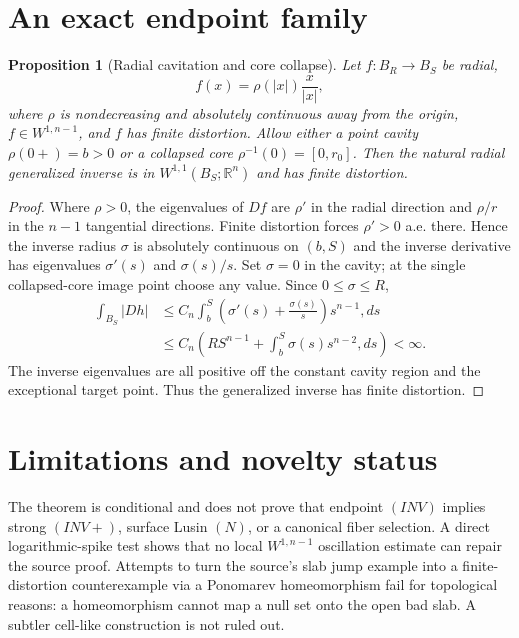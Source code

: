 \documentclass[11pt]{article}
\newtheorem{proposition}{Proposition}
\newcommand{\R}{\mathbb R}
\begin{document}
\section{An exact endpoint family}

\begin{proposition}[Radial cavitation and core collapse]
Let $f:B_R\to B_S$ be radial,
\[
 f(x)=\rho(|x|)\frac{x}{|x|},
\]
where $\rho$ is nondecreasing and absolutely continuous away from the origin,
$f\in W^{1,n-1}$, and $f$ has finite distortion.  Allow either a point
cavity $\rho(0+)=b>0$ or a collapsed core $\rho^{-1}(0)=[0,r_0]$.
Then the natural radial generalized inverse is in $W^{1,1}(B_S;\R^n)$ and
has finite distortion.
\end{proposition}

\begin{proof}
Where $\rho>0$, the eigenvalues of $Df$ are $\rho'$ in the radial direction
and $\rho/r$ in the $n-1$ tangential directions.  Finite distortion forces
$\rho'>0$ a.e. there.  Hence the inverse radius $\sigma$ is absolutely
continuous on $(b,S)$ and the inverse derivative has eigenvalues
$\sigma'(s)$ and $\sigma(s)/s$.  Set $\sigma=0$ in the cavity; at the single
collapsed-core image point choose any value.  Since $0\leq\sigma\leq R$,
\begin{align*}
 \int_{B_S}|Dh|
 &\leq C_n\int_b^S
 \left(\sigma'(s)+\frac{\sigma(s)}s\right)s^{n-1},ds\\
 &\leq C_n\left(RS^{n-1}+
 \int_b^S\sigma(s)s^{n-2},ds\right)<\infty.
\end{align*}
The inverse eigenvalues are all positive off the constant cavity region and
the exceptional target point.  Thus the generalized inverse has finite
distortion.
\end{proof}

\section{Limitations and novelty status}

The theorem is conditional and does not prove that endpoint $(INV)$ implies
strong $(INV+)$, surface Lusin $(N)$, or a canonical fiber selection.  A
direct logarithmic-spike test shows that no local $W^{1,n-1}$ oscillation
estimate can repair the source proof.  Attempts to turn the source's slab
jump example into a finite-distortion counterexample via a Ponomarev
homeomorphism fail for topological reasons: a homeomorphism cannot map a null
set onto the open bad slab.  A subtler cell-like construction is not ruled
out.
\end{document}
